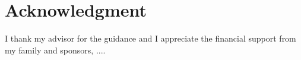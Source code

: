 \section{Acknowledgment}
I thank my advisor for the guidance and I appreciate the financial support from my family and sponsors, .... 